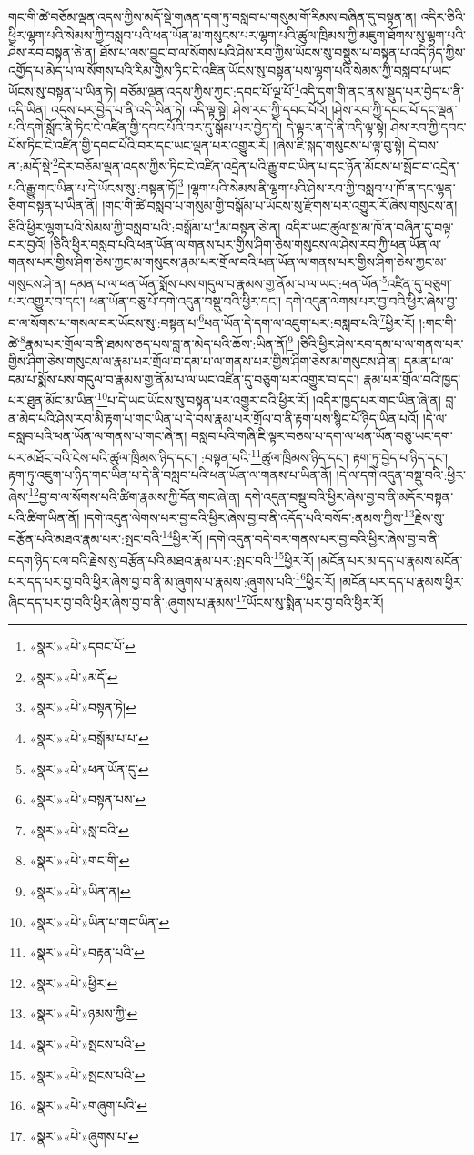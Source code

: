 གང་གི་ཚེ་བཅོམ་ལྡན་འདས་ཀྱིས་མདོ་སྡེ་གཞན་དག་ཏུ་བསླབ་པ་གསུམ་གོ་རིམས་བཞིན་དུ་བསྟན་ན། འདིར་ཅིའི་ཕྱིར་ལྷག་པའི་སེམས་ཀྱི་བསླབ་པའི་ཕན་ཡོན་མ་གསུངས་པར་ལྷག་པའི་ཚུལ་ཁྲིམས་ཀྱི་མཇུག་ཐོགས་སུ་ལྷག་པའི་ཤེས་རབ་བསྟན་ཅེ་ན། ཐོས་པ་ལས་བྱུང་བ་ལ་སོགས་པའི་ཤེས་རབ་ཀྱིས་ཡོངས་སུ་བསྡུས་པ་བསྟན་པ་འདི་ཉིད་ཀྱིས་འགྱོད་པ་མེད་པ་ལ་སོགས་པའི་རིམ་གྱིས་ཏིང་ངེ་འཛིན་ཡོངས་སུ་བསྟན་པས་ལྷག་པའི་སེམས་ཀྱི་བསླབ་པ་ཡང་ཡོངས་སུ་བསྟན་པ་ཡིན་ཏེ། བཅོམ་ལྡན་འདས་ཀྱིས་ཀྱང་:དབང་པོ་ལྔ་པོ་\footnote{«སྣར་»«པེ་»དབང་པོ་}འདི་དག་གི་ནང་ནས་སྡུད་པར་བྱེད་པ་ནི་འདི་ཡིན། འདུས་པར་བྱེད་པ་ནི་འདི་ཡིན་ཏེ། འདི་ལྟ་སྟེ། ཤེས་རབ་ཀྱི་དབང་པོའོ། །ཤེས་རབ་ཀྱི་དབང་པོ་དང་ལྡན་པའི་དགེ་སློང་ནི་ཏིང་ངེ་འཛིན་གྱི་དབང་པོའི་བར་དུ་སྒོམ་པར་བྱེད་དེ། དེ་ལྟར་ན་དེ་ནི་འདི་ལྟ་སྟེ། ཤེས་རབ་ཀྱི་དབང་པོས་ཏིང་ངེ་འཛིན་གྱི་དབང་པོའི་བར་དང་ཡང་ལྡན་པར་འགྱུར་རོ། །ཞེས་ཇི་སྐད་གསུངས་པ་ལྟ་བུ་སྟེ། དེ་བས་ན་:མདོ་སྡེ་\footnote{«སྣར་»«པེ་»མདོ་}དེར་བཅོམ་ལྡན་འདས་ཀྱིས་ཏིང་ངེ་འཛིན་འདྲེན་པའི་རྒྱུ་གང་ཡིན་པ་དང་ཉོན་མོངས་པ་སྤོང་བ་འདྲེན་པའི་རྒྱུ་གང་ཡིན་པ་དེ་ཡོངས་སུ་:བསྟན་ཏོ།\footnote{«སྣར་»«པེ་»བསྟན་ཏེ།} །ལྷག་པའི་སེམས་ནི་ལྷག་པའི་ཤེས་རབ་ཀྱི་བསླབ་པ་ཁོ་ན་དང་ལྷན་ཅིག་བསྟན་པ་ཡིན་ནོ། །གང་གི་ཚེ་བསླབ་པ་གསུམ་གྱི་བསྒོམ་པ་ཡོངས་སུ་རྫོགས་པར་འགྱུར་རོ་ཞེས་གསུངས་ན། ཅིའི་ཕྱིར་ལྷག་པའི་སེམས་ཀྱི་བསླབ་པའི་:བསྒོམ་པ་\footnote{«སྣར་»«པེ་»བསྒོམ་པ་པ་}མ་བསྟན་ཅེ་ན། འདིར་ཡང་ཚུལ་སྔ་མ་ཁོ་ན་བཞིན་དུ་བལྟ་བར་བྱའོ། །ཅིའི་ཕྱིར་བསླབ་པའི་ཕན་ཡོན་ལ་གནས་པར་གྱིས་ཤིག་ཅེས་གསུངས་ལ་ཤེས་རབ་ཀྱི་ཕན་ཡོན་ལ་གནས་པར་གྱིས་ཤིག་ཅེས་ཀྱང་མ་གསུངས་རྣམ་པར་གྲོལ་བའི་ཕན་ཡོན་ལ་གནས་པར་གྱིས་ཤིག་ཅེས་ཀྱང་མ་གསུངས་ཤེ་ན། དམན་པ་ལ་ཕན་ཡོན་སྨོས་པས་གདུལ་བ་རྣམས་གྱ་ནོམ་པ་ལ་ཡང་:ཕན་ཡོན་\footnote{«སྣར་»«པེ་»ཕན་ཡོན་དུ་}འཛིན་དུ་བཅུག་པར་འགྱུར་བ་དང་། ཕན་ཡོན་བཅུ་པོ་དགེ་འདུན་བསྡུ་བའི་ཕྱིར་དང་། དགེ་འདུན་ལེགས་པར་བྱ་བའི་ཕྱིར་ཞེས་བྱ་བ་ལ་སོགས་པ་གསལ་བར་ཡོངས་སུ་:བསྟན་པ་\footnote{«སྣར་»«པེ་»བསྟན་པས་}ཕན་ཡོན་དེ་དག་ལ་འཇུག་པར་:བསླབ་པའི་\footnote{«སྣར་»«པེ་»སླ་བའི་}ཕྱིར་རོ། །:གང་གི་ཚེ་\footnote{«སྣར་»«པེ་»གང་གི་}རྣམ་པར་གྲོལ་བ་ནི་ཐམས་ཅད་པས་བླ་ན་མེད་པའི་ཆོས་:ཡིན་ནོ།\footnote{«སྣར་»«པེ་»ཡིན་ན།} །ཅིའི་ཕྱིར་ཤེས་རབ་དམ་པ་ལ་གནས་པར་གྱིས་ཤིག་ཅེས་གསུངས་ལ་རྣམ་པར་གྲོལ་བ་དམ་པ་ལ་གནས་པར་གྱིས་ཤིག་ཅེས་མ་གསུངས་ཤེ་ན། དམན་པ་ལ་དམ་པ་སྨོས་པས་གདུལ་བ་རྣམས་གྱ་ནོམ་པ་ལ་ཡང་འཛིན་དུ་བཅུག་པར་འགྱུར་བ་དང་། རྣམ་པར་གྲོལ་བའི་ཁྱད་པར་ཐུན་མོང་མ་ཡིན་\footnote{«སྣར་»«པེ་»ཡིན་པ་གང་ཡིན་}པ་དེ་ཡང་ཡོངས་སུ་བསྟན་པར་འགྱུར་བའི་ཕྱིར་རོ། །འདིར་ཁྱད་པར་གང་ཡིན་ཞེ་ན། བླ་ན་མེད་པའི་ཤེས་རབ་མི་རྟག་པ་གང་ཡིན་པ་དེ་བས་རྣམ་པར་གྲོལ་བ་ནི་རྟག་པས་སྙིང་པོ་ཉིད་ཡིན་པའོ། །དེ་ལ་བསླབ་པའི་ཕན་ཡོན་ལ་གནས་པ་གང་ཞེ་ན། བསླབ་པའི་གཞི་ཇི་ལྟར་བཅས་པ་དག་ལ་ཕན་ཡོན་བཅུ་ཡང་དག་པར་མཐོང་བའི་ངེས་པའི་ཚུལ་ཁྲིམས་ཉིད་དང་། :བསྟན་པའི་\footnote{«སྣར་»«པེ་»བརྟན་པའི་}ཚུལ་ཁྲིམས་ཉིད་དང་། རྟག་ཏུ་བྱེད་པ་ཉིད་དང་། རྟག་ཏུ་འཇུག་པ་ཉིད་གང་ཡིན་པ་དེ་ནི་བསླབ་པའི་ཕན་ཡོན་ལ་གནས་པ་ཡིན་ནོ། །དེ་ལ་དགེ་འདུན་བསྡུ་བའི་:ཕྱིར་ཞེས་\footnote{«སྣར་»«པེ་»ཕྱིར་}བྱ་བ་ལ་སོགས་པའི་ཚིག་རྣམས་ཀྱི་དོན་གང་ཞེ་ན། དགེ་འདུན་བསྡུ་བའི་ཕྱིར་ཞེས་བྱ་བ་ནི་མདོར་བསྟན་པའི་ཚིག་ཡིན་ནོ། །དགེ་འདུན་ལེགས་པར་བྱ་བའི་ཕྱིར་ཞེས་བྱ་བ་ནི་འདོད་པའི་བསོད་:ནམས་ཀྱིས་\footnote{«སྣར་»«པེ་»ཉམས་ཀྱི་}རྗེས་སུ་བརྩོན་པའི་མཐའ་རྣམ་པར་:སྤང་བའི་\footnote{«སྣར་»«པེ་»སྤངས་པའི་}ཕྱིར་རོ། །དགེ་འདུན་བདེ་བར་གནས་པར་བྱ་བའི་ཕྱིར་ཞེས་བྱ་བ་ནི་བདག་ཉིད་ངལ་བའི་རྗེས་སུ་བརྩོན་པའི་མཐའ་རྣམ་པར་:སྤང་བའི་\footnote{«སྣར་»«པེ་»སྤངས་པའི་}ཕྱིར་རོ། །མངོན་པར་མ་དད་པ་རྣམས་མངོན་པར་དད་པར་བྱ་བའི་ཕྱིར་ཞེས་བྱ་བ་ནི་མ་ཞུགས་པ་རྣམས་:ཞུགས་པའི་\footnote{«སྣར་»«པེ་»གཞུག་པའི་}ཕྱིར་རོ། །མངོན་པར་དད་པ་རྣམས་ཕྱིར་ཞིང་དད་པར་བྱ་བའི་ཕྱིར་ཞེས་བྱ་བ་ནི་:ཞུགས་པ་རྣམས་\footnote{«སྣར་»«པེ་»ཞུགས་པ་}ཡོངས་སུ་སྨིན་པར་བྱ་བའི་ཕྱིར་རོ། 
